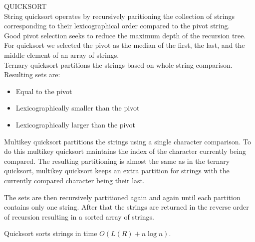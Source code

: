 {\sffamily\normalsize{\color{sciorange} QUICKSORT}}\vspace{1mm}\\
\footnotesize 
String quicksort operates by recursively paritioning the collection of strings corresponding to their lexicographical order compared to the pivot string.\\ 

Good pivot selection seeks to reduce the maximum depth of the recursion tree. For quicksort we selected the pivot as the median of the first, the last, and the middle element of an array of strings.\\

Ternary quicksort partitions the strings based on whole string comparison. Resulting sets are:
    
\begin{itemize}
    \item Equal to the pivot
    \item Lexicographically smaller than the pivot
    \item Lexicographically larger than the pivot
\end{itemize}

Multikey quicksort partitions the strings using a single character comparison. To do this multikey quicksort maintains the index of the character currently being compared. The resulting partitioning is almost the same as in the ternary quicksort, multikey quicksort keeps an extra partition for strings with the currently compared character being their last. 

The sets are then recursively partitioned again and again until each partition contains only one string. After that the strings are returned in the reverse order of recursion resulting in a sorted array of strings. 

Quicksort sorts strings in time $O(L(R) + n \log n)$.



